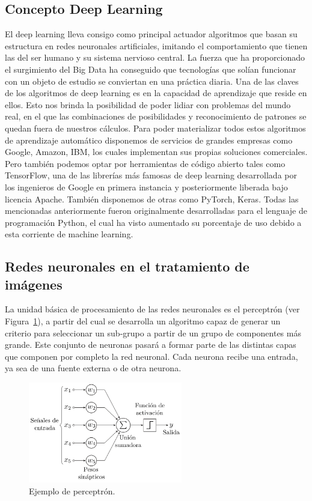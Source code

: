 \subsection{Concepto Deep Learning}\label{subsec:concepto-deep-learning}
El deep learning lleva consigo como principal actuador algoritmos que basan su estructura en redes neuronales artificiales, imitando el comportamiento que tienen las del ser humano y su sistema nervioso central.
La fuerza que ha proporcionado el surgimiento del Big Data ha conseguido que tecnologías que solían funcionar con un objeto de estudio se conviertan en una práctica
diaria.
Una de las claves de los algoritmos de deep learning es en la capacidad de aprendizaje que reside en ellos.
Esto nos brinda la posibilidad de poder lidiar con problemas del mundo real,
en el que las combinaciones de posibilidades y reconocimiento de patrones se quedan fuera de nuestros cálculos.
Para poder materializar todos estos algoritmos de aprendizaje automático disponemos de servicios de grandes empresas como Google, Amazon, IBM, los cuales
implementan sus propias soluciones comerciales.
Pero también podemos optar por herramientas de código abierto tales como TensorFlow, una de las librerías más famosas de deep learning desarrollada por los ingenieros de Google en primera instancia y posteriormente liberada bajo licencia Apache.
También disponemos de otras como PyTorch, Keras.
Todas las mencionadas anteriormente fueron originalmente desarrolladas para el lenguaje de programación Python, el cual ha visto aumentado su porcentaje de uso debido a esta corriente de
machine learning.

\subsection{Redes neuronales en el tratamiento de imágenes}\label{subsec:redes-neuronales-en-el-tratamiento-de-imágenes}
La unidad básica de procesamiento de las redes neuronales es el perceptrón (ver Figura~\ref{fig:Perceptrón}), a partir del cual se desarrolla un algoritmo capaz de generar un criterio para seleccionar un sub-grupo a partir de un grupo de componentes más grande.
Este conjunto de neuronas pasará a formar parte de las distintas capas que componen por completo la red neuronal.
Cada neurona recibe una entrada, ya sea de una fuente externa o de otra neurona.

\begin{figure}[H]
    \centering
    \includegraphics[width=0.6\textwidth]{images/chapter1/perceptron.png}
    \caption{Ejemplo de perceptrón.}
    \label{fig:Perceptrón}
\end{figure}

